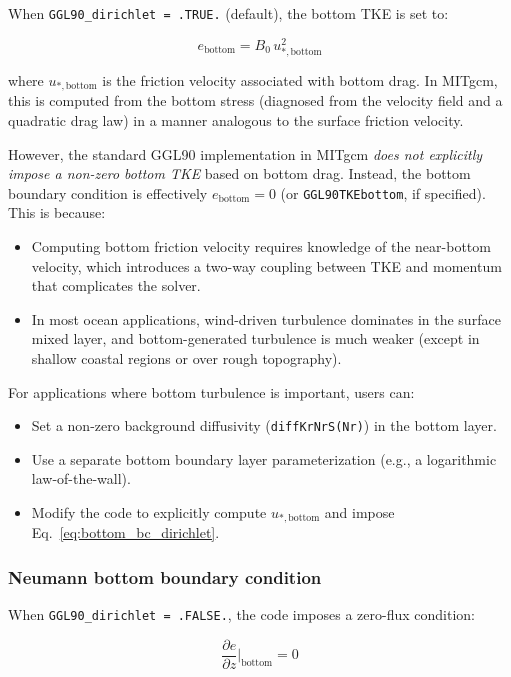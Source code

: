 \documentclass[12pt,letterpaper]{article}
\begin{document}
When \verb|GGL90_dirichlet = .TRUE.| (default), the bottom TKE is set to:

\begin{equation}
e_{\text{bottom}} = B_0 \, u_{*,\text{bottom}}^2
\label{eq:bottom_bc_dirichlet}
\end{equation}

where $u_{*,\text{bottom}}$ is the friction velocity associated with bottom drag. In MITgcm, this is computed from the bottom stress (diagnosed from the velocity field and a quadratic drag law) in a manner analogous to the surface friction velocity.

However, the standard GGL90 implementation in MITgcm \emph{does not explicitly impose a non-zero bottom TKE} based on bottom drag. Instead, the bottom boundary condition is effectively $e_{\text{bottom}} = 0$ (or \verb|GGL90TKEbottom|, if specified). This is because:
\begin{itemize}
\item Computing bottom friction velocity requires knowledge of the near-bottom velocity, which introduces a two-way coupling between TKE and momentum that complicates the solver.
\item In most ocean applications, wind-driven turbulence dominates in the surface mixed layer, and bottom-generated turbulence is much weaker (except in shallow coastal regions or over rough topography).
\end{itemize}

For applications where bottom turbulence is important, users can:
\begin{itemize}
\item Set a non-zero background diffusivity (\verb|diffKrNrS(Nr)|) in the bottom layer.
\item Use a separate bottom boundary layer parameterization (e.g., a logarithmic law-of-the-wall).
\item Modify the code to explicitly compute $u_{*,\text{bottom}}$ and impose Eq.~\eqref{eq:bottom_bc_dirichlet}.
\end{itemize}

\subsubsection{Neumann bottom boundary condition}

When \verb|GGL90_dirichlet = .FALSE.|, the code imposes a zero-flux condition:

\begin{equation}
\frac{\partial e}{\partial z}\bigg|_{\text{bottom}} = 0
\label{eq:bottom_bc_neumann}
\end{equation}
\end{document}
